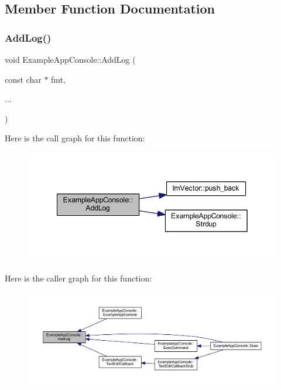 \subsection{Member Function Documentation}
\mbox{\label{struct_example_app_console_a719354ce6be7481923a5fd702e785952}} 
\subsubsection{\texorpdfstring{Add\+Log()}{AddLog()}}
{\footnotesize\ttfamily void Example\+App\+Console\+::\+Add\+Log (\begin{DoxyParamCaption}\item[{const char $\ast$}]{fmt,  }\item[{}]{... }\end{DoxyParamCaption})\hspace{0.3cm}{\ttfamily [inline]}}

Here is the call graph for this function\+:
\nopagebreak
\begin{figure}[H]
\begin{center}
\leavevmode
\includegraphics[width=342pt]{struct_example_app_console_a719354ce6be7481923a5fd702e785952_cgraph}
\end{center}
\end{figure}
Here is the caller graph for this function\+:
\nopagebreak
\begin{figure}[H]
\begin{center}
\leavevmode
\includegraphics[width=350pt]{struct_example_app_console_a719354ce6be7481923a5fd702e785952_icgraph}
\end{center}
\end{figure}
\mbox{\label{struct_example_app_console_a2ef13f00c474b16b8da2ec062d5e5cc2}} 

